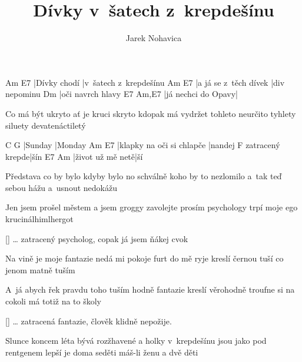 \documentclass{song}
\author{Jarek Nohavica}
\title{Dívky v~šatech z~krepdešínu}
\begin{document}
\begin{multicols}{2}
\strophe
Am           E7
|Dívky chodí |v~šatech z~krepdešínu
Am                    E7
|a já se z~těch dívek |div nepominu
Dm
|oči navrch hlavy
E7                 Am,E7
|já nechci do Opavy|
\endstrophe

\columnbreak

\strophe*
Co má být ukryto ať je kruci skryto
kdopak má vydržet tohleto neurčito
tyhlety siluety
devatenáctiletý
\endstrophe
\end{multicols}

C       G
|Sunday |Monday
Am                        E7
|klapky na oči si chlapče |nandej
                F
zatracený krepde|šín
E7               Am
|život už mě netě|ší
\endstrophe

\begin{multicols}{2}
\strophe*
Představa co by bylo kdyby bylo
no schválně koho by to nezlomilo
a~tak teď sebou hážu
a~usnout nedokážu
\endstrophe

\strophe*
Jen jsem prošel městem a jsem groggy
zavolejte prosím psychology
trpí moje ego
krucinálhimlhergot
\endstrophe
\end{multicols}

\ref{} \ldots{} zatracený psycholog, copak já jsem ňákej cvok

\begin{multicols}{2}
\strophe*
Na vině je moje fantazie
nedá mi pokoje furt do mě ryje
kreslí černou tuší
co jenom matně tuším
\endstrophe

\strophe*
A~já abych řek pravdu toho tuším hodně
fantazie kreslí věrohodně
troufne si na cokoli
má totiž na to školy
\endstrophe
\end{multicols}

\ref{} \ldots{} zatracená fantazie, člověk klidně nepožije.

\strophe*
Slunce koncem léta bývá rozžhavené
a holky v~krepdešínu jsou jako pod rentgenem
lepší je doma seděti
máš-li ženu a dvě děti
\endstrophe
\end{document}
